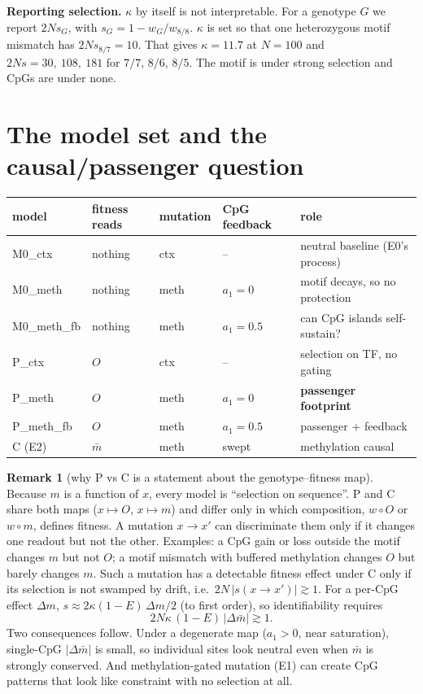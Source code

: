 \documentclass[11pt]{article}
\theoremstyle{definition}
\newtheorem{remark}{Remark}
\begin{document}
\textbf{Reporting selection.} $\kappa$ by itself is not interpretable. For a genotype $G$ we report
$2N s_G$, with $s_G=1-w_G/w_{8/8}$. $\kappa$ is set so that one heterozygous motif mismatch has $2Ns_{8/7}=10$. That gives
$\kappa=11.7$ at $N=100$ and $2Ns=30,\ 108,\ 181$ for $7/7$, $8/6$, $8/5$. The motif is under strong selection and
CpGs are under none.

\section{The model set and the causal/passenger question}\label{sec:models}
\begin{center}
\begin{tabular}{@{}lllll@{}}
\toprule
model & fitness reads & mutation & CpG feedback & role\\
\midrule
M0\_ctx & nothing & ctx & -- & neutral baseline (E0's process)\\
M0\_meth & nothing & meth & $a_1=0$ & motif decays, so no protection\\
M0\_meth\_fb & nothing & meth & $a_1=0.5$ & can CpG islands self-sustain?\\
P\_ctx & $O$ & ctx & -- & selection on TF, no gating\\
P\_meth & $O$ & meth & $a_1=0$ & \textbf{passenger footprint}\\
P\_meth\_fb & $O$ & meth & $a_1=0.5$ & passenger + feedback\\
C (E2) & $\bar m$ & meth & swept & methylation causal\\
\bottomrule
\end{tabular}
\end{center}
\begin{remark}[why P vs C is a statement about the genotype--fitness map]
Because $m$ is a function of $x$, every model is ``selection on sequence''. P and C share both maps
($x\mapsto O$, $x\mapsto m$) and differ only in which composition, $w\circ O$ or $w\circ m$, defines fitness. A
mutation $x\to x'$ can discriminate them only if it changes one readout but not the other. Examples: a CpG gain or loss
outside the motif changes $m$ but not $O$; a motif mismatch with buffered methylation changes $O$ but barely changes
$m$. Such a mutation has a detectable fitness effect under C only if its selection is not swamped by drift, i.e.\
$2N\,|s(x\to x')|\gtrsim 1$. For a per-CpG effect $\Delta m$, $s\approx 2\kappa(1-E)\,\Delta m/2$ (to first order),
so identifiability requires
\begin{equation}
2N\kappa\,(1-E)\,|\Delta \bar m| \gtrsim 1 .
\end{equation}
Two consequences follow. Under a degenerate map ($a_1>0$, near saturation), single-CpG $|\Delta\bar m|$ is small,
so individual sites look neutral even when $\bar m$ is strongly conserved. And methylation-gated mutation (E1) can
create CpG patterns that look like constraint with no selection at all.
\end{remark}
\end{document}
